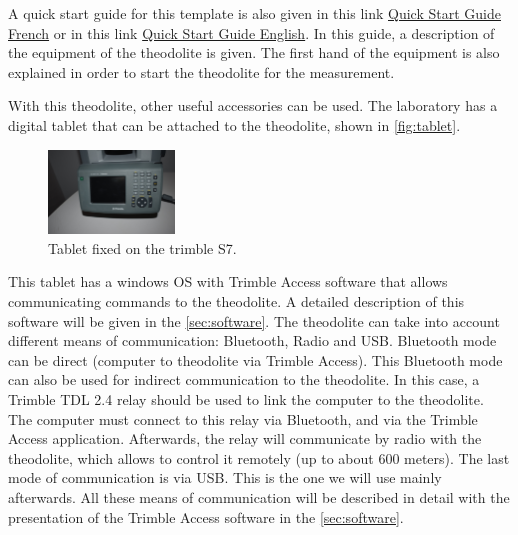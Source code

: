 \documentclass[10pt,letterpaper,oneside]{article}
\begin{document}
A quick start guide for this template is also given in this link \href{run:Quick_Start_Guide_French.pdf}{Quick Start Guide French} or in this link \href{run:Quick_Start_Guide_English.pdf}{Quick Start Guide English}.
In this guide, a description of the equipment of the theodolite is given.
The first hand of the equipment is also explained in order to start the theodolite for the measurement.

%

With this theodolite, other useful accessories can be used.
The laboratory has a digital tablet that can be attached to the theodolite, shown in \autoref{fig:tablet}.


\begin{figure}[htb]
	\centering
	\includegraphics[width=0.3\textwidth]{./figs/Tablet.JPG}
	\caption{Tablet fixed on the trimble S7.}
	\label{fig:tablet}
\end{figure}

This tablet has a windows OS with Trimble Access software that allows communicating commands to the theodolite.
A detailed description of this software will be given in the \autoref{sec:software}.
The theodolite can take into account different means of communication: Bluetooth, Radio and USB.
Bluetooth mode can be direct (computer to theodolite via Trimble Access).
This Bluetooth mode can also be used for indirect communication to the theodolite.
In this case, a Trimble TDL 2.4 relay should be used to link the computer to the theodolite.
The computer must connect to this relay via Bluetooth, and via the Trimble Access application. 
Afterwards, the relay will communicate by radio with the theodolite, which allows to control it remotely (up to about 600 meters).
The last mode of communication is via USB.
This is the one we will use mainly afterwards.
All these means of communication will be described in detail with the presentation of the Trimble Access software in the \autoref{sec:software}.
\end{document}
